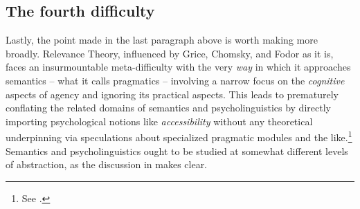 

\subsection{The fourth difficulty}

Lastly, the point made in the last paragraph above is worth making more broadly. Relevance Theory, influenced by Grice, Chomsky, and Fodor as it is, faces an insurmountable meta-difficulty with the very \emph{way} in which it approaches semantics -- what it calls pragmatics -- involving a narrow focus on the \emph{cognitive} aspects of agency and ignoring its practical aspects. This leads to prematurely conflating the related domains of semantics and psycholinguistics by directly importing psychological notions like \emph{accessibility} without any theoretical underpinning via speculations about specialized pragmatic modules and the like.\footnote{See \citet{sw:pmm}.} Semantics and psycholinguistics ought to be studied at somewhat different levels of abstraction, as the discussion in  makes clear.

